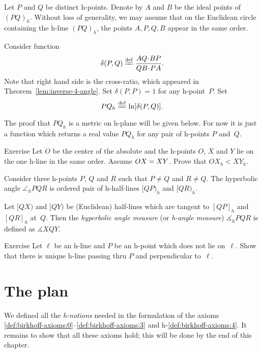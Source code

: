 \label{h-dist}
Let $P$ and $Q$ be distinct h-points.
Denote by $A$ and $B$ be the ideal points of $(PQ)_h$.
Without loss of generality, we may assume that on the Euclidean circle containing the h-line $(PQ)_h$, the points $A,P,Q,B$ appear in the same order.

Consider function 
$$\delta(P,Q)\df\frac{AQ\cdot BP}{QB\cdot PA}.$$
Note that right hand side is the cross-ratio, 
which appeared in Theorem~\ref{lem:inverse-4-angle}.
Set $\delta(P,P)=1$ for any h-point~$P$.
Set 
$$PQ_h\df\ln[\delta(P,Q)].$$

The proof that $PQ_h$ is a metric on h-plane will be given below.
For now it is just a function which returns a real value $PQ_h$ for any pair of h-points $P$ and~$Q$.

\begin{thm}{Exercise}\label{ex:h-dist-eq}
Let $O$ be the center of the absolute and the h-points $O$, $X$ and $Y$ lie on the one h-line in the same order.
Assume $OX\z=XY$.
Prove that $OX_h<XY_h$.
\end{thm}


\label{h-angle measure}
Consider three h-points $P$, $Q$ and $R$
such that $P\ne Q$ and $R\ne Q$.
The hyperbolic angle $\angle_h PQR$ is ordered pair of h-half-lines $[QP)_h$ and $[QR)_h$.

Let $[QX)$ and $[QY)$ be (Euclidean) half-lines 
which are tangent to $[QP]_h$ and $[QR]_h$ 
at~$Q$.
Then the \emph{hyperbolic angle measure} (or \emph{h-angle measure}) 
$\measuredangle_h PQR$ is defined as
$\measuredangle XQY$.

\begin{thm}{Exercise}\label{ex:h-perp-unique}
Let $\ell$ be an h-line and $P$ be an h-point which does not lie on~$\ell$.
Show that there is unique h-line passing thru $P$ 
and perpendicular to~$\ell$.
\end{thm}

\section*{The plan}

We defined all the {}\emph{h-notions} needed in the formulation of the axioms \ref{def:birkhoff-axioms:0}--\ref{def:birkhoff-axioms:3} and h-\ref{def:birkhoff-axioms:4}.
It remains to show that all these axioms hold; 
this will be done by the end of this chapter.


